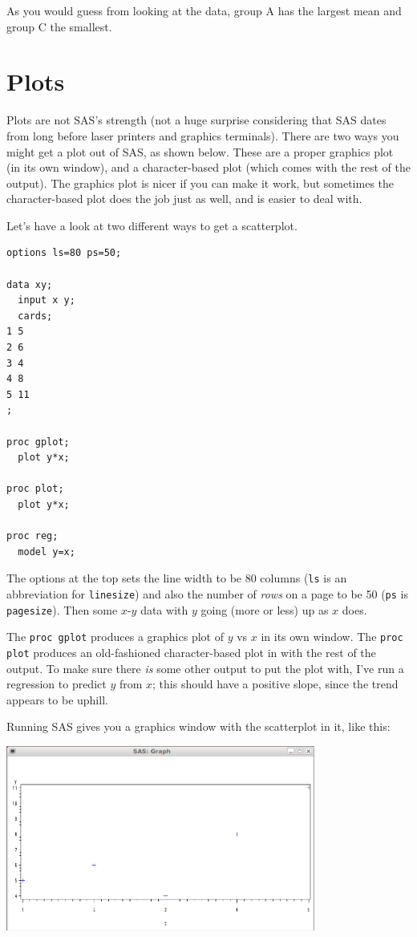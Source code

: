\documentclass[11pt]{article}
\begin{document}
As you would guess from looking at the data, group A has the largest
mean and group C the smallest.


\section{Plots}
\label{sec:plots}


Plots are not SAS's strength (not a huge surprise considering that SAS
dates from long before laser printers and graphics terminals). There
are two ways you might get a plot out of SAS, as shown below. These
are a proper graphics plot (in its own window), and a character-based
plot (which comes with the rest of the output). The graphics plot is
nicer if you can make it work, but sometimes the character-based plot
does the job just as well, and is easier to deal with.

Let's have a look at two different ways to get a scatterplot.

\begin{verbatim}
options ls=80 ps=50;

data xy;
  input x y;
  cards;
1 5 
2 6
3 4
4 8
5 11
;

proc gplot;
  plot y*x;

proc plot;
  plot y*x;

proc reg;
  model y=x;

\end{verbatim}

The options at the top sets the line width to be 80 columns
(\texttt{ls} is an abbreviation for \texttt{linesize}) and also the
number of \emph{rows} on a page to be 50 (\texttt{ps} is
\texttt{pagesize}). Then some $x$-$y$  data with $y$ going (more or
less) up as $x$ does. 

The \texttt{proc gplot} produces a graphics plot of $y$ vs $x$ in its
own window. The \texttt{proc plot} produces an old-fashioned
character-based plot in with the rest of the output. To make sure
there \emph{is} some other output to put the plot with, I've run a
regression to predict $y$ from $x$; this should have a positive slope,
since the trend appears to be uphill.

Running SAS gives you a graphics window with the scatterplot in it,
like this:

\filbreak
\includegraphics[width=4in]{plot1}
\filbreak
\end{document}

